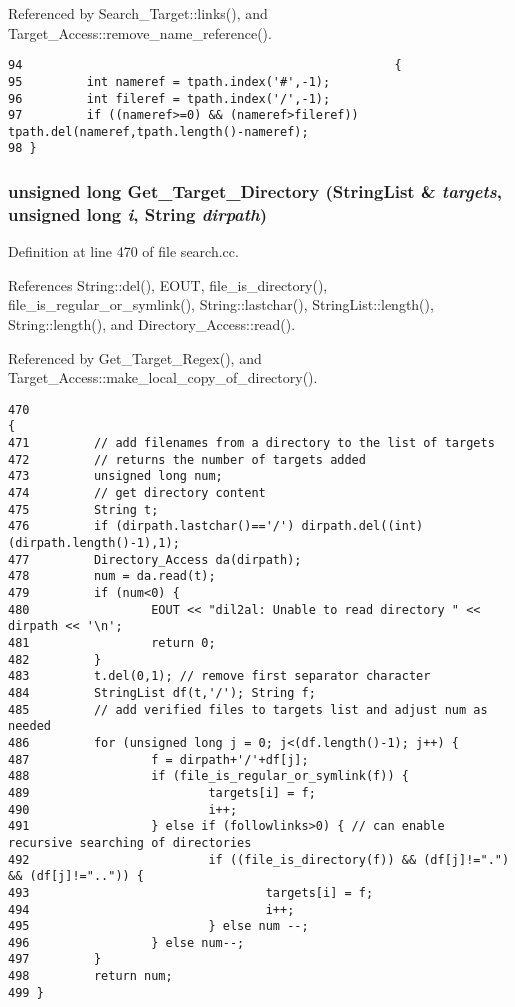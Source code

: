 Referenced by Search\_\-Target::links(), and Target\_\-Access::remove\_\-name\_\-reference().



\footnotesize\begin{verbatim}94                                                    {
95         int nameref = tpath.index('#',-1);
96         int fileref = tpath.index('/',-1);
97         if ((nameref>=0) && (nameref>fileref)) tpath.del(nameref,tpath.length()-nameref);
98 }
\end{verbatim}\normalsize 
{}
\subsubsection{\setlength{\rightskip}{0pt plus 5cm}unsigned long Get\_\-Target\_\-Directory ({\bf String\-List} \& {\em targets}, unsigned long {\em i}, {\bf String} {\em dirpath})}\label{search_8cc_a3}




Definition at line 470 of file search.cc.

References String::del(), EOUT, file\_\-is\_\-directory(), file\_\-is\_\-regular\_\-or\_\-symlink(), String::lastchar(), String\-List::length(), String::length(), and Directory\_\-Access::read().

Referenced by Get\_\-Target\_\-Regex(), and Target\_\-Access::make\_\-local\_\-copy\_\-of\_\-directory().



\footnotesize\begin{verbatim}470                                                                                           {
471         // add filenames from a directory to the list of targets
472         // returns the number of targets added
473         unsigned long num;
474         // get directory content
475         String t;
476         if (dirpath.lastchar()=='/') dirpath.del((int) (dirpath.length()-1),1);
477         Directory_Access da(dirpath);
478         num = da.read(t);
479         if (num<0) {
480                 EOUT << "dil2al: Unable to read directory " << dirpath << '\n';
481                 return 0;
482         }
483         t.del(0,1); // remove first separator character
484         StringList df(t,'/'); String f;
485         // add verified files to targets list and adjust num as needed
486         for (unsigned long j = 0; j<(df.length()-1); j++) {
487                 f = dirpath+'/'+df[j];
488                 if (file_is_regular_or_symlink(f)) {
489                         targets[i] = f;
490                         i++;
491                 } else if (followlinks>0) { // can enable recursive searching of directories
492                         if ((file_is_directory(f)) && (df[j]!=".") && (df[j]!="..")) {
493                                 targets[i] = f;
494                                 i++;
495                         } else num --;
496                 } else num--;
497         }
498         return num;
499 }
\end{verbatim}\normalsize 
{}
